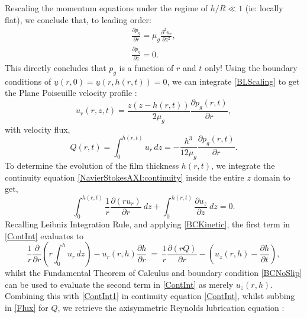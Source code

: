 \documentclass[11pt,a4paper]{article}
\begin{document}
	Rescaling the momentum equations under the regime of $h / R \ll 1$ (ie: locally flat), we conclude that, to leading order:
	\begin{subequations}\label{BoundaryLayerScaling}
		\begin{align}
			\frac{\partial p_g}{\partial r} = \mu_g \frac{\partial^2 u_r}{\partial z^2},\label{BLScaling} \\
			\frac{\partial p_g}{\partial z} = 0.
		\end{align}
	\end{subequations}
	This directly concludes that $p_g$ is a function of $r$ and $t$ only! Using the boundary conditions of $\underline{u}(r,0) = \underline{u}(r,h(r,t)) = 0$, we can integrate \eqref{BLScaling} to get the Plane Poiseuille velocity profile :
	\begin{equation}
		u_r(r,z,t) = \frac{z(z-h(r,t))}{2\mu_g} \frac{\partial p_g(r,t)}{\partial r},
	\end{equation}
	with velocity flux,
	\begin{equation}
		\label{Flux}
		Q(r,t) = \int^{h(r,t)}_0 u_r\, dz = -\frac{h^3}{12\mu_g} \frac{\partial p_g(r,t)}{\partial r}.
	\end{equation}
	To determine the evolution of the film thickness $h(r,t)$, we integrate the continuity equation \eqref{NavierStokesAXI:continuity} inside the entire $z$ domain  to get,
	\begin{equation}
		\label{ContInt}
		\int_0^{h(r,t)} \frac{1}{r} \frac{\partial (r u_r)}{\partial r}\ dz + \int_0^{h(r,t)} \frac{\partial u_z}{\partial z} \ dz = 0.
	\end{equation}
	Recalling Leibniz Integration Rule, and applying \eqref{BCKinetic}, the first term in \eqref{ContInt} evaluates to
	\begin{equation}
		\label{ContInt1}
		\frac{1}{r} \frac{\partial}{\partial r}\left( r \int_0^h u_r\, dz \right) - u_r(r,h)\frac{\partial h}{\partial r} \ =\ \frac{1}{r} \frac{\partial (r Q)}{\partial r} - \left( u_z(r,h) - \frac{\partial h}{\partial t} \right),
	\end{equation}
	whilst the Fundamental Theorem of Calculus and boundary condition \eqref{BCNoSlip} can be used to evaluate the second term in \eqref{ContInt} as merely $u_z(r,h)$. Combining this with \eqref{ContInt1} in continuity equation \eqref{ContInt}, whilst subbing in \eqref{Flux} for $Q$, we retrieve the axisymmetric Reynolds lubrication equation :
\end{document}
